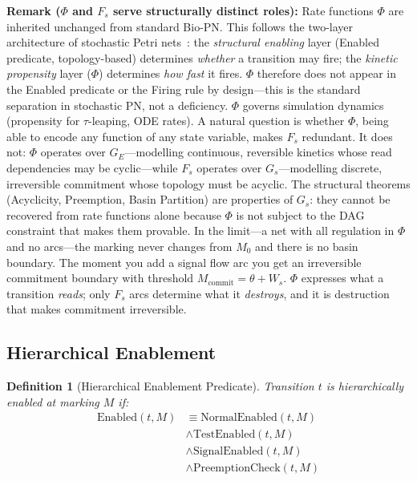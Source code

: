 \documentclass[10pt,letterpaper]{article}
\newtheorem{definition}{Definition}
\begin{document}
\textbf{Remark ($\Phi$ and $F_s$ serve structurally distinct roles):} Rate functions $\Phi$ are inherited unchanged from standard Bio-PN.
This follows the two-layer architecture of stochastic Petri nets~\cite{goss1998}: the
\emph{structural enabling} layer (Enabled predicate, topology-based) determines
\emph{whether} a transition may fire; the \emph{kinetic propensity} layer ($\Phi$)
determines \emph{how fast} it fires.
$\Phi$ therefore does not appear in the Enabled predicate or the Firing rule by
design---this is the standard separation in stochastic PN, not a deficiency.
$\Phi$ governs simulation dynamics (propensity for $\tau$-leaping, ODE rates).
A natural question is whether $\Phi$, being able to encode any function of any state variable, makes $F_s$ redundant. It does not: $\Phi$ operates over $G_E$---modelling continuous, reversible kinetics whose read dependencies may be cyclic---while $F_s$ operates over $G_s$---modelling discrete, irreversible commitment whose topology must be acyclic. The structural theorems (Acyclicity, Preemption, Basin Partition) are properties of $G_s$: they cannot be recovered from rate functions alone because $\Phi$ is not subject to the DAG constraint that makes them provable. In the limit---a net with all regulation in $\Phi$ and no arcs---the marking never changes from $M_0$ and there is no basin boundary. The moment you add a signal flow arc you get an irreversible commitment boundary with threshold $M_{\text{commit}} = \theta + W_s$. $\Phi$ expresses what a transition \textit{reads}; only $F_s$ arcs determine what it \textit{destroys}, and it is destruction that makes commitment irreversible.

\subsection{Hierarchical Enablement}

\begin{definition}[Hierarchical Enablement Predicate]
Transition $t$ is hierarchically enabled at marking $M$ if:
\begin{align}
\text{Enabled}(t, M) &\equiv \text{NormalEnabled}(t,M) \nonumber \\
&\wedge \text{TestEnabled}(t,M) \nonumber \\
&\wedge \text{SignalEnabled}(t,M) \nonumber \\
&\wedge \text{PreemptionCheck}(t,M)
\end{align}
\end{definition}
\end{document}
